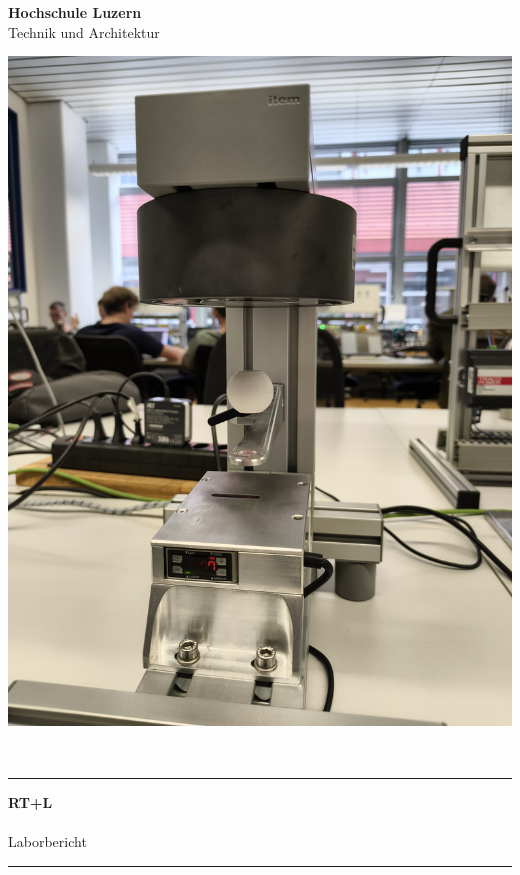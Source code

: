 \begin{titlepage}
    \begin{center}
        \textbf{\huge{Hochschule Luzern}}\\
        \vspace{2mm}
        \large{Technik und Architektur}\\
        \vspace{5mm}
    \end{center}

    \vspace{0mm}

    \begin{center}
        \includegraphics[trim=0cm 0cm 0cm 0cm,clip=true, width=0.5\linewidth]{./figure/cover.jpg}
        \\
    \end{center} 


    \begin{center}
        \rule{\textwidth}{2pt}
    \end{center}

    \begin{center}
      \textbf{\huge{RT+L}}\\
        \vspace{2mm}
        \Large{\makeatletter \@title  \makeatother}\\
        \vspace{2mm}
        \large{Laborbericht}
    \end{center}

    \begin{center}
        \rule{\textwidth}{2pt}
    \end{center}


\end{titlepage}
